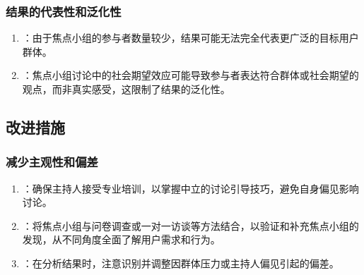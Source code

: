 \documentclass[letterpaper,10pt,english]{sphinxmanual}
\begin{document}
\subsubsection{结果的代表性和泛化性}
\label{\detokenize{user-research/focus-group:id35}}\begin{enumerate}
%
\item {} 
\sphinxAtStartPar
{}：由于焦点小组的参与者数量较少，结果可能无法完全代表更广泛的目标用户群体。

\item {} 
\sphinxAtStartPar
{}：焦点小组讨论中的社会期望效应可能导致参与者表达符合群体或社会期望的观点，而非真实感受，这限制了结果的泛化性。

\end{enumerate}


\subsection{改进措施}
\label{\detokenize{user-research/focus-group:id36}}

\subsubsection{减少主观性和偏差}
\label{\detokenize{user-research/focus-group:id37}}\begin{enumerate}
%
\item {} 
\sphinxAtStartPar
{}：确保主持人接受专业培训，以掌握中立的讨论引导技巧，避免自身偏见影响讨论。

\item {} 
\sphinxAtStartPar
{}：将焦点小组与问卷调查或一对一访谈等方法结合，以验证和补充焦点小组的发现，从不同角度全面了解用户需求和行为。

\item {} 
\sphinxAtStartPar
{}：在分析结果时，注意识别并调整因群体压力或主持人偏见引起的偏差。

\end{enumerate}
\end{document}
